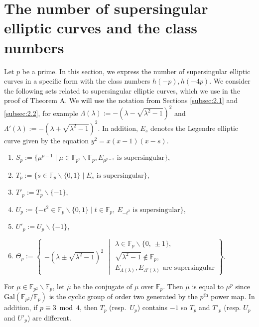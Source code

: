 \documentclass[a4paper, 11pt]{article}
\theoremstyle{plain}
\newcommand{\?}{\textcolor{red}{??}}
\newcommand{\lm}{\lambda}
\newcommand{\Lm}{\Lambda}
\newcommand{\fp}{\mathbb{F}_p}
\newcommand{\fpp}{\mathbb{F}_{p^2}}
\begin{document}
\section{The number of supersingular elliptic curves and the class numbers}\label{sec:ssing_and_classnum}
Let $p$ be a prime. In this section, we express the number of supersingular elliptic curves in a specific form with the class numbers $h(-p),h(-4p)$.
We consider the following sets related to supersingular elliptic curves, which we use in the proof of Theorem A.
We \textcolor{black}{will} use the notation \textcolor{black}{from} Sections \ref{subsec:2.1} and \ref{subsec:2.2}, for example $\Lm(\lm):=-(\lm - \sqrt{{\lm}^2-1})^2$ and ${\Lm}'(\lm):= -(\lm + \sqrt{{\lm}^2-1})^2$. In addition, $E_s$ denotes the Legendre elliptic curve given by the equation $y^2=x(x-1)(x-s)$.
\begin{enumerate}
      \item[]$S_p:=\{ {\mu}^{p-1} \mid \mu \in \fpp \smallsetminus \fp , E_{{\mu}^{p-1}} \text{ is supersingular} \}$,
    \item [] $T_p:=\{ s \in \fp\smallsetminus\{0,1 \} \mid E_s\text{ is supersingular} \}$,
    \item[] $T'_p:=T_p\smallsetminus\{-1\}$,
    \item[] $U_p:=\{-t^2 \in \fp\smallsetminus\{0,1 \} \mid t\in \fp,\ E_{-t^2} \text{ is supersingular} \}$,
    \item[] $U'_p:=U_p\smallsetminus\{-1\}$,
 \item[] ${\Theta}_p:=\left\{
 \begin{array}{cc}
       -(\lm \pm \sqrt{{\lm}^2-1})^2 
 \end{array}
\middle|  
 \begin{array}{ccc}
       \lm \in \fp \smallsetminus\{0,\ \pm1\},\\ \sqrt{{\lm}^2-1} \notin \fp ,\\
      E_{\Lm(\lm)},E_{{\Lm}'(\lm)}\text{ are supersingular}
 \end{array}
\right\}$.
\end{enumerate}
For $\mu \in \fpp \smallsetminus \fp$, let $\overline{\mu}$ be the conjugate of $\mu$ over $\fp$. Then $\overline{\mu}$ is equal to ${\mu}^p$ \textcolor{black}{since $\text{Gal}(\fpp/\fp)$ is the cyclic group of order two generated by the $p^{\text{th}}$ power map.} In addition, if \textcolor{black}{$p \equiv 3\bmod 4$}, then $T_p$ (resp.\ $U_p$) contains $-1$ so $T_p$ and $T'_p$ (resp. $U_p$ and $U'_p$) are different. 
\end{document}
